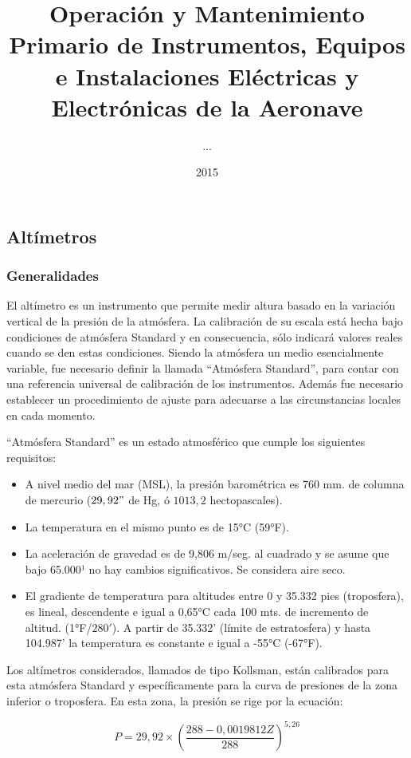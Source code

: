 \documentclass{article}
\title{Operación y Mantenimiento Primario de Instrumentos, Equipos e Instalaciones Eléctricas y Electrónicas de la Aeronave}
\author{...}
\date{2015}
\begin{document}
\maketitle
\pagebreak
\tableofcontents
\pagebreak
		

\subsection{Altímetros}
\subsubsection*{Generalidades}
El altímetro es un instrumento que permite medir altura basado en la variación vertical de la presión de la atmósfera. La calibración de su escala está hecha bajo condiciones de atmósfera Standard y en consecuencia, sólo indicará valores reales cuando se den estas condiciones.
Siendo la atmósfera un medio esencialmente variable, fue necesario definir la llamada ``Atmósfera Standard'', para contar con una referencia universal de calibración de los instrumentos. Además fue necesario establecer un procedimiento de ajuste para adecuarse a las circunstancias locales en cada momento.

``Atmósfera Standard'' es un estado atmosférico que cumple los siguientes requisitos:

\begin{itemize}
\item A nivel medio del mar (MSL), la presión barométrica es 760 mm. de columna de mercurio ($29,92"$ de Hg, ó $1013,2$ hectopascales).
\item La temperatura en el mismo punto es de 15°C (59°F).
\item La aceleración de gravedad es de 9,806 m/seg. al cuadrado y se asume que bajo 65.000¹ no hay cambios significativos. Se considera aire seco.
\item El gradiente de temperatura para altitudes entre 0 y 35.332 pies (troposfera), es lineal, descendente e igual a 0,65°C cada 100 mts. de incremento de altitud. (1°F/$280'$).
A partir de 35.332' (límite de estratosfera) y hasta 104.987' la temperatura es constante e igual a -55°C (-67°F).
\end{itemize}
Los altímetros considerados, llamados de tipo Kollsman, están calibrados para esta atmósfera Standard y específicamente para la curva de presiones de la zona inferior o troposfera.
En esta zona, la presión se rige por la ecuación:

$$P = 29,92 \times(\frac{288 - 0,0019812Z}{288})^{5,26}$$
\end{document}
